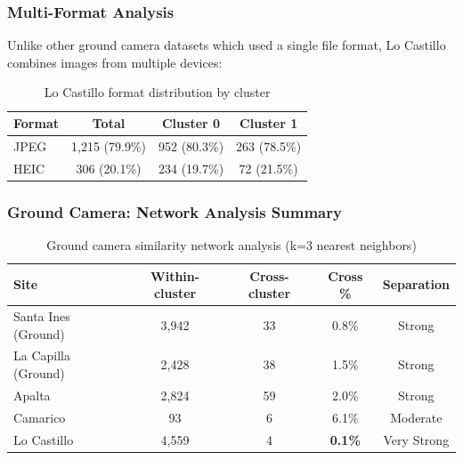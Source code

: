 
\subsubsection{Multi-Format Analysis}

Unlike other ground camera datasets which used a single file format, Lo Castillo combines images from multiple devices:

\begin{table}[H]
\centering
\caption{Lo Castillo format distribution by cluster}
\label{tab:loc_format}
\begin{tabular}{lccc}
\toprule
\textbf{Format} & \textbf{Total} & \textbf{Cluster 0} & \textbf{Cluster 1} \\
\midrule
JPEG & 1,215 (79.9\%) & 952 (80.3\%) & 263 (78.5\%) \\
HEIC & 306 (20.1\%) & 234 (19.7\%) & 72 (21.5\%) \\
\bottomrule
\end{tabular}
\end{table}


\subsubsection{Ground Camera: Network Analysis Summary}

\begin{table}[H]
\centering
\caption{Ground camera similarity network analysis (k=3 nearest neighbors)}
\label{tab:ground_network}
\begin{tabular}{lcccc}
\toprule
\textbf{Site} & \textbf{Within-cluster} & \textbf{Cross-cluster} & \textbf{Cross \%} & \textbf{Separation} \\
\midrule
Santa Ines (Ground) & 3,942 & 33 & 0.8\% & Strong \\
La Capilla (Ground) & 2,428 & 38 & 1.5\% & Strong \\
Apalta & 2,824 & 59 & 2.0\% & Strong \\
Camarico & 93 & 6 & 6.1\% & Moderate \\
Lo Castillo & 4,559 & 4 & \textbf{0.1\%} & Very Strong \\
\bottomrule
\end{tabular}
\end{table}

